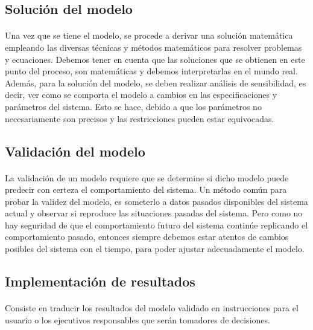 \documentclass[12pt, a4paper,spanish]{article}
\begin{document}
		\subsection{Solución del modelo}

			\paragraph{}
			Una vez que se tiene el modelo, se procede a derivar una solución matemática empleando las diversas técnicas y métodos matemáticos para resolver problemas y ecuaciones. Debemos tener en cuenta que las soluciones que se obtienen en este punto del proceso, son matemáticas y debemos interpretarlas en el mundo real. Además, para la solución del modelo, se deben realizar análisis de sensibilidad, es decir, ver como se comporta el modelo a cambios en las especificaciones y parámetros del sistema. Esto se hace, debido a que los parámetros no necesariamente son precisos y las restricciones pueden estar equivocadas.\cite{invdeop_IO}

		\subsection{Validación del modelo}

			\paragraph{}
			La validación de un modelo requiere que se determine si dicho modelo puede predecir con certeza el comportamiento del sistema. Un método común para probar la validez del modelo, es someterlo a datos pasados disponibles del sistema actual y observar si reproduce las situaciones pasadas del sistema. Pero como no hay seguridad de que el comportamiento futuro del sistema continúe replicando el comportamiento pasado, entonces siempre debemos estar atentos de cambios posibles del sistema con el tiempo, para poder ajustar adecuadamente el modelo.\cite{invdeop_IO}

		\subsection{Implementación de resultados}

			\paragraph{}
			Consiste en traducir los resultados del modelo validado en instrucciones para el usuario o los ejecutivos responsables que serán tomadores de decisiones.\cite{invdeop_IO}
\end{document}
